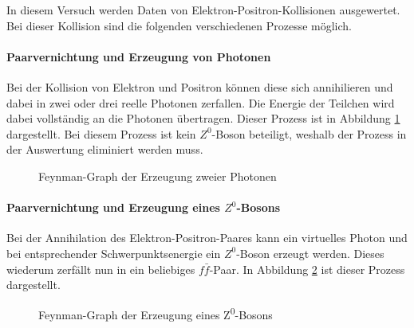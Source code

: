 In diesem Versuch werden Daten von Elektron-Positron-Kollisionen ausgewertet. Bei dieser Kollision sind die folgenden verschiedenen Prozesse möglich.
\paragraph{Paarvernichtung und Erzeugung von Photonen}
Bei der Kollision von Elektron und Positron können diese sich annihilieren und dabei in zwei oder drei reelle Photonen zerfallen. Die Energie der Teilchen wird dabei vollständig an die Photonen übertragen. Dieser Prozess ist in Abbildung \ref{fig:feynmanphotonen} dargestellt. Bei diesem Prozess ist kein $Z^0$-Boson beteiligt, weshalb der Prozess in der Auswertung eliminiert werden muss.

\begin{figure}
	\centering
	\caption{Feynman-Graph der Erzeugung zweier Photonen}
	\label{fig:feynmanphotonen}
\end{figure}

\paragraph{Paarvernichtung und Erzeugung eines $Z^0$-Bosons}
Bei der Annihilation des Elektron-Positron-Paares kann ein virtuelles Photon und bei entsprechender Schwerpunktsenergie ein $Z^0$-Boson erzeugt werden. Dieses wiederum zerfällt nun in ein beliebiges $f\bar f$-Paar. In Abbildung \ref{fig:feynmanz0} ist dieser Prozess dargestellt.

\begin{figure}
	\centering
	\caption{Feynman-Graph der Erzeugung eines Z\textsuperscript0-Bosons}
	\label{fig:feynmanz0}
\end{figure}


